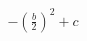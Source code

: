 \documentclass[preview]{standalone}
\begin{document}
\begin{align*}
- \left(\frac{b}{2}\right)^2 + c
\end{align*}
\end{document}
